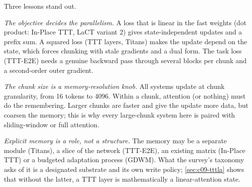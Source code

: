 Three lessons stand out.

\emph{The objective decides the parallelism.} A loss that is linear in the fast weights (dot
product: In-Place TTT, LaCT variant 2) gives state-independent updates and a prefix sum. A
squared loss (TTT layers, Titans) makes the update depend on the state, which forces chunking
with stale gradients and a dual form. The task loss (TTT-E2E) needs a genuine backward pass
through several blocks per chunk and a second-order outer gradient.

\emph{The chunk size is a memory-resolution knob.} All systems update at chunk granularity, from
16 tokens to 4096. Within a chunk, attention (or nothing) must do the remembering. Larger chunks
are faster and give the update more data, but coarsen the memory; this is why every large-chunk
system here is paired with sliding-window or full attention.

\emph{Explicit memory is a role, not a structure.} The memory may be a separate module (Titans),
a slice of the network (TTT-E2E), an existing matrix (In-Place TTT) or a budgeted adaptation
process (GDWM). What the survey's taxonomy asks of it is a designated substrate and its own
write policy; \cref{sec:c09-tttla} shows that without the latter, a TTT layer is mathematically
a linear-attention state.

